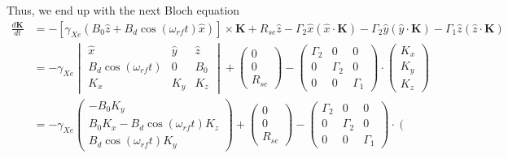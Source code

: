 \documentclass{article}
\begin{document}
Thus, we end up with the next Bloch equation
\begin{align}
    \frac{d \mathbf{K}}{d t} &= -\left[\gamma_{Xe}\left( B_0\hat{z} + B_d \cos{(\omega_{rf} t)}\hat{x}\right) \right] \times\mathbf{K}  +R_{se}\hat{z} - \Gamma_2 \hat{x}\left(\hat{x}\cdot \mathbf{K}\right)  - \Gamma_2 \hat{y}\left(\hat{y}\cdot \mathbf{K}\right) -  \Gamma_1 \hat{z}\left(\hat{z}\cdot \mathbf{K}\right)\\
    &= -\gamma_{Xe} \begin{vmatrix}
        \hat{x}                     & \hat{y}       & \hat{z} \\
         B_d\cos{(\omega_{rf} t)}   & 0             & B_0  \\
         K_x                        & K_y           & K_z
    \end{vmatrix} + 
    \left(\begin{matrix}
         0  \\
         0  \\
         R_{se} 
    \end{matrix}\right) - 
    \left(\begin{matrix}
    \Gamma_2  &  0  &0\\
    0  &  \Gamma_2  &  0\\
    0  &  0  &  \Gamma_1 
    \end{matrix}\right)\cdot
    \left(\begin{matrix}
    K_x\\
    K_y\\
    K_z
    \end{matrix}\right)\\
    &= - \gamma_{Xe} 
    \left(\begin{matrix}
    -B_0 K_y\\
    B_0 K_x - B_d \cos{(\omega_{rf} t)} K_z\\
    B_d \cos{(\omega_{rf} t)} K_y
    \end{matrix}\right) + 
    \left(\begin{matrix}
         0  \\
         0  \\
         R_{se} 
    \end{matrix}\right) - 
    \left(\begin{matrix}
    \Gamma_2  &  0  &0\\
    0  &  \Gamma_2  &  0\\
    0  &  0  &  \Gamma_1 
    \end{matrix}\right)\cdot
    \left(\begin{matrix}

\end{matrix}
\end{align}
\end{document}
